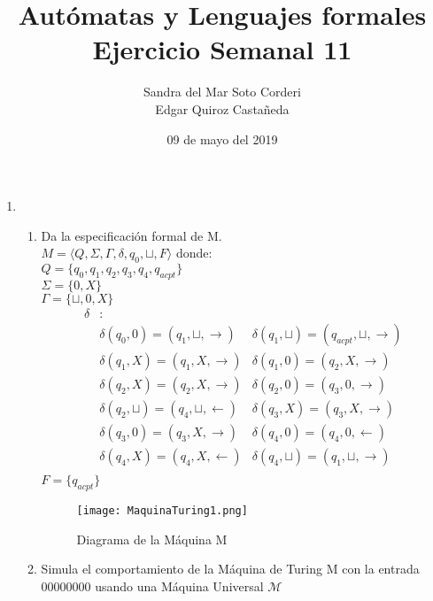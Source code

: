 \documentclass{article}
\begin{document}
    \title{
        Autómatas y Lenguajes formales \\
        Ejercicio Semanal 11
    }

    \author{
        Sandra del Mar Soto Corderi \\
        Edgar Quiroz Castañeda
    }

    \date{
        09 de mayo del 2019
    }

    \maketitle

    \begin{enumerate}
        \item {
        	\begin{enumerate}
        	\item {        	
        	Da la especificación formal de M.\\
        	
        	$M = \langle Q, \Sigma, \Gamma, \delta, q_0, \sqcup, F\rangle$ donde:\\
        	
        	$Q = \{q_0, q_1, q_2, q_3, q_4, q_{acpt}\}$\\
        	$\Sigma = \{0, X\}$\\
        	$\Gamma = \{\sqcup, 0, X \}$
        	\begin{align*}
				\delta &:\\
				&\delta(q_0, 0) = (q_1, \sqcup, \rightarrow)
				&\delta(q_1, \sqcup) = (q_{acpt}, \sqcup, \rightarrow)\\
				&\delta(q_1, X) = (q_{1}, X, \rightarrow)
				&\delta(q_1, 0) = (q_2, X, \rightarrow)\\
				&\delta(q_2, X) = (q_2, X, \rightarrow)
				&\delta(q_2, 0) = (q_3, 0, \rightarrow)\\
				&\delta(q_2, \sqcup) = (q_4, \sqcup, \leftarrow)
				&\delta(q_3, X) = (q_3, X, \rightarrow)\\
				&\delta(q_3, 0) = (q_3, X, \rightarrow)
				&\delta(q_4, 0) = (q_4, 0, \leftarrow)\\
				&\delta(q_4, X) = (q_4, X, \leftarrow)
				&\delta(q_4, \sqcup) = (q_1, \sqcup, \rightarrow)\\
        	\end{align*}
        	$F = \{q_{acpt}\}$
        	        	
        	\begin{figure} [H]
        		\centering
        		\texttt{[image: MaquinaTuring1.png]}
        		\caption{Diagrama de la Máquina M}
        	\end{figure}
        }
    	\item {
    	Simula el comportamiento de la Máquina de Turing M con la entrada 00000000 usando una Máquina Universal $\mathcal{M}$\\
    	
}
\end{enumerate}}
\end{enumerate}
\end{document}

